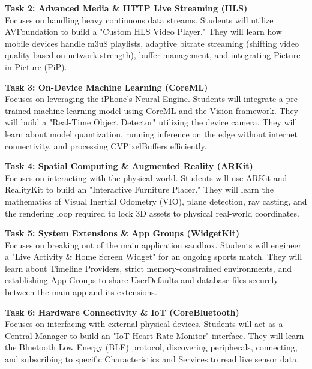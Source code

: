 \vspace{0.3cm}

\noindent\textbf{Task 2: Advanced Media \& HTTP Live Streaming (HLS)} \\
Focuses on handling heavy continuous data streams. Students will utilize AVFoundation to build a "Custom HLS Video Player." They will learn how mobile devices handle m3u8 playlists, adaptive bitrate streaming (shifting video quality based on network strength), buffer management, and integrating Picture-in-Picture (PiP).

\vspace{0.3cm}

\noindent\textbf{Task 3: On-Device Machine Learning (CoreML)} \\
Focuses on leveraging the iPhone’s Neural Engine. Students will integrate a pre-trained machine learning model using CoreML and the Vision framework. They will build a "Real-Time Object Detector" utilizing the device camera. They will learn about model quantization, running inference on the edge without internet connectivity, and processing CVPixelBuffers efficiently.

\vspace{0.3cm}

\noindent\textbf{Task 4: Spatial Computing \& Augmented Reality (ARKit)} \\
Focuses on interacting with the physical world. Students will use ARKit and RealityKit to build an "Interactive Furniture Placer." They will learn the mathematics of Visual Inertial Odometry (VIO), plane detection, ray casting, and the rendering loop required to lock 3D assets to physical real-world coordinates.

\vspace{0.3cm}

\noindent\textbf{Task 5: System Extensions \& App Groups (WidgetKit)} \\
Focuses on breaking out of the main application sandbox. Students will engineer a "Live Activity \& Home Screen Widget" for an ongoing sports match. They will learn about Timeline Providers, strict memory-constrained environments, and establishing App Groups to share UserDefaults and database files securely between the main app and its extensions.

\vspace{0.3cm}

\noindent\textbf{Task 6: Hardware Connectivity \& IoT (CoreBluetooth)} \\
Focuses on interfacing with external physical devices. Students will act as a Central Manager to build an "IoT Heart Rate Monitor" interface. They will learn the Bluetooth Low Energy (BLE) protocol, discovering peripherals, connecting, and subscribing to specific Characteristics and Services to read live sensor data.

